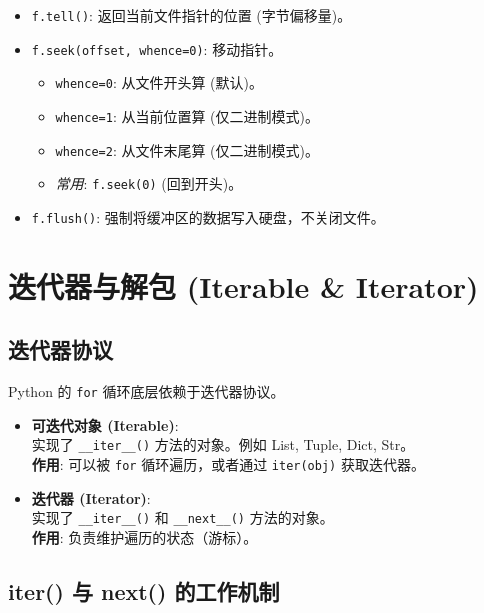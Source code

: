 \documentclass[12pt, a4paper]{article}
\begin{document}
\begin{itemize}
    \item \texttt{f.tell()}: 返回当前文件指针的位置 (字节偏移量)。
    \item \texttt{f.seek(offset, whence=0)}: 移动指针。
    \begin{itemize}
        \item \texttt{whence=0}: 从文件开头算 (默认)。
        \item \texttt{whence=1}: 从当前位置算 (仅二进制模式)。
        \item \texttt{whence=2}: 从文件末尾算 (仅二进制模式)。
        \item \textit{常用}: \texttt{f.seek(0)} (回到开头)。
    \end{itemize}
    \item \texttt{f.flush()}: 强制将缓冲区的数据写入硬盘，不关闭文件。
\end{itemize}

\section{迭代器与解包 (Iterable \& Iterator)}

\subsection{迭代器协议}

Python 的 \texttt{for} 循环底层依赖于迭代器协议。

\begin{itemize}
    \item \textbf{可迭代对象 (Iterable)}: 
    \\ 实现了 \texttt{\_\_iter\_\_()} 方法的对象。例如 List, Tuple, Dict, Str。
    \\ \textbf{作用}: 可以被 \texttt{for} 循环遍历，或者通过 \texttt{iter(obj)} 获取迭代器。
    
    \item \textbf{迭代器 (Iterator)}: 
    \\ 实现了 \texttt{\_\_iter\_\_()} 和 \texttt{\_\_next\_\_()} 方法的对象。
    \\ \textbf{作用}: 负责维护遍历的状态（游标）。
\end{itemize}

\subsection{iter() 与 next() 的工作机制}
\end{document}
